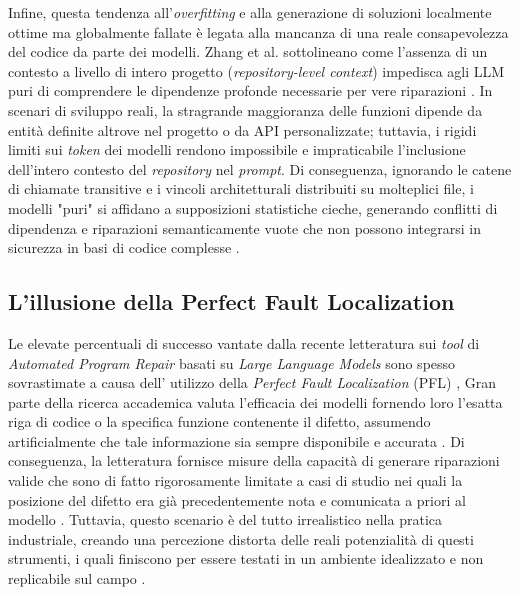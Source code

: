 Infine, questa tendenza all'\textit{overfitting} e alla generazione di soluzioni localmente ottime ma 
globalmente fallate è legata alla mancanza di una reale consapevolezza 
del codice da parte dei modelli. Zhang et al. sottolineano come l'assenza di un contesto a livello di intero progetto 
(\textit{repository-level context}) impedisca agli LLM puri di comprendere le dipendenze profonde necessarie 
per vere riparazioni \cite{zhang2024llmhallucinations}. In scenari di sviluppo reali, la stragrande maggioranza delle funzioni 
dipende da entità definite altrove nel progetto o da API personalizzate; tuttavia, i rigidi limiti 
sui \textit{token} dei modelli rendono impossibile e impraticabile l'inclusione dell'intero 
contesto del \textit{repository} nel \textit{prompt}. Di conseguenza, ignorando le catene di chiamate transitive 
e i vincoli architetturali distribuiti su molteplici file, i modelli "puri" si affidano 
a supposizioni statistiche cieche, generando conflitti di dipendenza e riparazioni semanticamente 
vuote che non possono integrarsi in sicurezza in basi di codice complesse \cite{zhang2024llmhallucinations,zhang2025semanticforge}.

\subsection{L'illusione della Perfect Fault Localization}

Le elevate percentuali di successo vantate dalla recente letteratura sui 
\textit{tool} di \textit{Automated Program Repair} basati su \textit{Large Language Models} 
sono spesso sovrastimate a causa dell' utilizzo della \textit{Perfect Fault Localization} (PFL) \cite{li2024hybrid}, Gran parte della ricerca 
accademica valuta l'efficacia dei modelli fornendo loro l'esatta riga di codice o la specifica 
funzione contenente il difetto, assumendo artificialmente che tale informazione sia sempre 
disponibile e accurata \cite{li2024hybrid}. Di conseguenza, la letteratura fornisce misure della capacità di generare 
riparazioni valide che sono di fatto rigorosamente limitate a casi di studio nei quali la posizione del difetto 
era già precedentemente nota e comunicata a priori al modello \cite{li2024hybrid,campos2025exploring}. 
Tuttavia, questo scenario è del tutto irrealistico nella pratica industriale, creando una percezione 
distorta delle reali potenzialità di questi strumenti, i quali finiscono per essere testati in un 
ambiente idealizzato e non replicabile sul campo \cite{campos2025exploring}.

